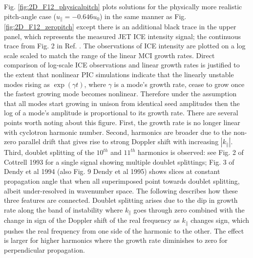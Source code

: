 \documentclass[12pt]{iopart}
\begin{document}
Fig. \ref{fig:2D_F12_physicalpitch} plots solutions for the physically more
realistic pitch-angle
case ($u_\parallel = -0.646 u_0$) in the same manner as Fig.
\ref{fig:2D_F12_zeropitch} except there is an additional black trace in the
upper panel, which represents the measured JET ICE intensity signal; the continuous
trace from Fig. 2 in Ref. \cite{Cottrell1993}.
The observations of ICE intensity are plotted on a log scale scaled to match
the range of the linear MCI growth rates.
Direct comparison of log-scale
ICE observations and linear growth rates is justified to the extent that
nonlinear PIC simulations indicate that the linearly unstable modes rising
as $\exp(\gamma t)$, where $\gamma$ is a mode's growth rate,
cease to grow once the fastest growing mode becomes
nonlinear\cite{Cook2013}.
Therefore under the assumption that all modes start growing in unison from
identical seed amplitudes then the log of a mode's amplitude is
proportional to its growth rate.
There are several points worth noting about this figure. First, the
growth rate is no longer linear with cyclotron harmonic number. Second,
harmonics are broader due to the non-zero parallel drift that gives rise to
strong Doppler shift with increasing $|k_\parallel|$. Third, doublet splitting
of the $10^{th}$ and $11^{th}$ harmonics is observed: see Fig. 2 of Cottrell 1993 for a single
signal showing multiple doublet splittings; Fig. 3 of Dendy et al 1994 (also
Fig. 9 Dendy et al 1995) shows slices at constant propagation angle that when
all superimposed point towards doublet splitting, albeit under-resolved in
wavenumber space. The following describes how these three features are
connected. Doublet splitting arises due to the dip in growth rate along the 
band of instability where
$k_\parallel$ goes through zero combined with the change in sign of the Doppler
shift of the real frequency as $k_\parallel$ changes sign, which pushes the real
frequency from one side of the harmonic to the other. The effect is
larger for higher harmonics where the growth rate diminishes to zero for
perpendicular propagation.
\end{document}
